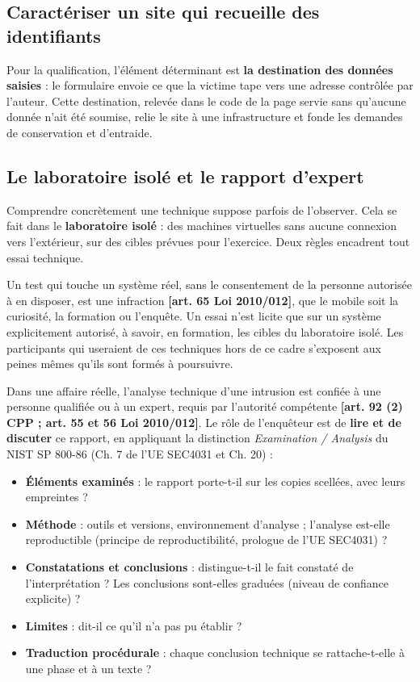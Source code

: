\subsection{Caractériser un site qui recueille des identifiants}

Pour la qualification, l'élément déterminant est \textbf{la destination des données saisies} : le formulaire envoie ce que la victime tape vers une adresse contrôlée par l'auteur. Cette destination, relevée dans le code de la page servie sans qu'aucune donnée n'ait été soumise, relie le site à une infrastructure et fonde les demandes de conservation et d'entraide.

\subsection{Le laboratoire isolé et le rapport d'expert}

Comprendre concrètement une technique suppose parfois de l'observer. Cela se fait dans le \textbf{laboratoire isolé} : des machines virtuelles sans aucune connexion vers l'extérieur, sur des cibles prévues pour l'exercice. Deux règles encadrent tout essai technique.

\begin{boxalert}
Un test qui touche un système réel, sans le consentement de la personne autorisée à en disposer, est une infraction \textbf{[art. 65 Loi 2010/012]}, que le mobile soit la curiosité, la formation ou l'enquête. Un essai n'est licite que sur un système explicitement autorisé, à savoir, en formation, les cibles du laboratoire isolé. Les participants qui useraient de ces techniques hors de ce cadre s'exposent aux peines mêmes qu'ils sont formés à poursuivre.
\end{boxalert}

Dans une affaire réelle, l'analyse technique d'une intrusion est confiée à une personne qualifiée ou à un expert, requis par l'autorité compétente \textbf{[art. 92 (2) CPP ; art. 55 et 56 Loi 2010/012]}. Le rôle de l'enquêteur est de \textbf{lire et de discuter} ce rapport, en appliquant la distinction \emph{Examination / Analysis} du NIST SP 800-86 (Ch. 7 de l'UE SEC4031 et Ch. 20) :

\begin{itemize}
\item \textbf{Éléments examinés} : le rapport porte-t-il sur les copies scellées, avec leurs empreintes ?
\item \textbf{Méthode} : outils et versions, environnement d'analyse ; l'analyse est-elle reproductible (principe de reproductibilité, prologue de l'UE SEC4031) ?
\item \textbf{Constatations et conclusions} : distingue-t-il le fait constaté de l'interprétation ? Les conclusions sont-elles graduées (niveau de confiance explicite) ?
\item \textbf{Limites} : dit-il ce qu'il n'a pas pu établir ?
\item \textbf{Traduction procédurale} : chaque conclusion technique se rattache-t-elle à une phase et à un texte ?
\end{itemize}

